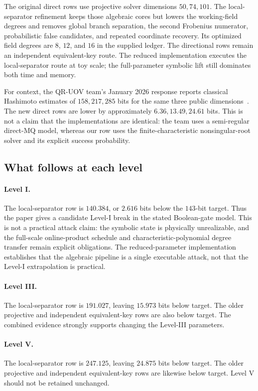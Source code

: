 \documentclass[11pt,a4paper]{article}
\theoremstyle{definition}
\theoremstyle{remark}
\begin{document}
The original direct rows use projective solver dimensions $50,74,101$.
The local-separator refinement keeps those algebraic cores but lowers the
working-field degrees and removes global branch separation, the second
Frobenius numerator, probabilistic false candidates, and repeated coordinate
recovery.  Its optimized field degrees are $8$, $12$, and $16$ in the supplied
ledger.  The directional rows remain an independent equivalent-key route.
The reduced implementation executes the local-separator route at toy scale;
the full-parameter symbolic lift still dominates both time and memory.

For context, the QR-UOV team's January 2026 response reports classical
Hashimoto estimates of $158,217,285$ bits for the same three public
dimensions~\cite{QRUOVResponse2026}.  The new direct rows are lower by
approximately $6.36,13.49,24.61$ bits.  This is not a claim that the
implementations are identical: the team uses a semi-regular direct-MQ model,
whereas our row uses the finite-characteristic nonsingular-root solver and its
explicit success probability.

\subsection{What follows at each level}
\paragraph{Level I.}
The local-separator row is $140.384$, or $2.616$ bits below the $143$-bit
target.  Thus the paper gives a candidate Level-I break in the stated
Boolean-gate model.  This is not a practical attack claim: the symbolic state
is physically unrealizable, and the full-scale online-product schedule and
characteristic-polynomial degree transfer remain explicit obligations.  The
reduced-parameter implementation establishes that the algebraic pipeline is a
single executable attack, not that the Level-I extrapolation is practical.

\paragraph{Level III.}
The local-separator row is $191.027$, leaving $15.973$ bits below target.  The
older projective and independent equivalent-key rows are also below target.
The combined evidence strongly supports changing the Level-III parameters.

\paragraph{Level V.}
The local-separator row is $247.125$, leaving $24.875$ bits below target.  The
older projective and independent equivalent-key rows are likewise below target.
Level V should not be retained unchanged.
\end{document}
